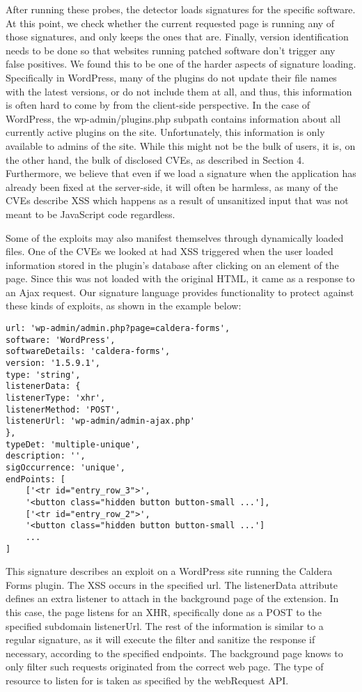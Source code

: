 After running these probes, the detector loads signatures for the specific software. At this point, we check whether the current requested page is running any of those signatures, and only keeps the ones that are. Finally, version identification needs to be done so that websites running patched software don't trigger any false positives. We found this to be one of the harder aspects of signature loading. Specifically in WordPress, many of the plugins do not update their file names with the latest versions, or do not include them at all, and thus, this information is often hard to come by from the client-side perspective. In the case of WordPress, the wp-admin/plugins.php subpath contains information about all currently active plugins on the site. Unfortunately, this information is only available to admins of the site. While this might not be the bulk of users, it is, on the other hand, the bulk of disclosed CVEs, as described in Section 4. Furthermore, we believe that even if we load a signature when the application has already been fixed at the server-side, it will often be harmless, as many of the CVEs describe XSS which happens as a result of unsanitized input that was not meant to be JavaScript code regardless.

Some of the exploits may also manifest themselves through dynamically loaded files. One of the CVEs we looked at had XSS triggered when the user loaded information stored in the plugin's database after clicking on an element of the page. Since this was not loaded with the original HTML, it came as a response to an Ajax request. Our signature language provides functionality to protect against these kinds of exploits, as shown in the example below:

 \lstset{basicstyle=\small}
\begin{lstlisting}
url: 'wp-admin/admin.php?page=caldera-forms',
software: 'WordPress',
softwareDetails: 'caldera-forms',
version: '1.5.9.1',
type: 'string',
listenerData: {
listenerType: 'xhr',
listenerMethod: 'POST',
listenerUrl: 'wp-admin/admin-ajax.php'
},
typeDet: 'multiple-unique',
description: '',
sigOccurrence: 'unique',
endPoints: [
	['<tr id="entry_row_3">', 
	'<button class="hidden button button-small ...'],
	['<tr id="entry_row_2">', 
	'<button class="hidden button button-small ...']
	...
]
\end{lstlisting}

This signature describes an exploit on a WordPress site running the Caldera Forms plugin. The XSS occurs in the specified url. The listenerData attribute defines an extra listener to attach in the background page of the extension. In this case, the page listens for an XHR, specifically done as a POST to the specified subdomain listenerUrl. The rest of the information is similar to a regular signature, as it will execute the filter and sanitize the response if necessary, according to the specified endpoints. The background page knows to only filter such requests originated from the correct web page. The type of resource to listen for is taken as specified by the webRequest API. 

